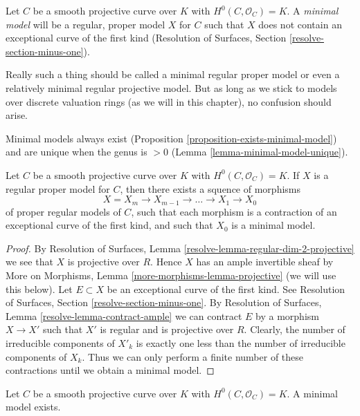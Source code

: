 \begin{definition}
\label{definition-minimal-model}
Let $C$ be a smooth projective curve over $K$ with
$H^0(C, \mathcal{O}_C) = K$. A {\it minimal model}
will be a regular, proper model $X$ for $C$ such that
$X$ does not contain an exceptional curve of the first kind
(Resolution of Surfaces, Section \ref{resolve-section-minus-one}).
\end{definition}

\noindent
Really such a thing should be called a minimal regular proper model
or even a relatively minimal regular projective model. But as long
as we stick to models over discrete valuation rings (as we will
in this chapter), no confusion should arise.

\medskip\noindent
Minimal models always exist
(Proposition \ref{proposition-exists-minimal-model}) and are unique
when the genus is $> 0$ (Lemma \ref{lemma-minimal-model-unique}).

\begin{lemma}
\label{lemma-pre-exists-minimal-model}
Let $C$ be a smooth projective curve over $K$ with
$H^0(C, \mathcal{O}_C) = K$. If $X$ is a regular proper
model for $C$, then there exists a squence of morphisms
$$
X = X_m \to X_{m - 1} \to \ldots \to X_1 \to X_0
$$
of proper regular models of $C$, such that each morphism is a
contraction of an exceptional curve of the first kind, and such
that $X_0$ is a minimal model.
\end{lemma}

\begin{proof}
By Resolution of Surfaces, Lemma \ref{resolve-lemma-regular-dim-2-projective}
we see that $X$ is projective over $R$. Hence $X$ has an ample
invertible sheaf by
More on Morphisms, Lemma \ref{more-morphisms-lemma-projective}
(we will use this below).
Let $E \subset X$ be an exceptional curve of the first kind.
See Resolution of Surfaces, Section \ref{resolve-section-minus-one}.
By Resolution of Surfaces, Lemma \ref{resolve-lemma-contract-ample}
we can contract $E$ by a morphism $X \to X'$ such that $X'$ is
regular and is projective over $R$. Clearly, the number of
irreducible components of $X'_k$ is exactly one less than the
number of irreducible components of $X_k$. Thus we can only
perform a finite number of these contractions until we
obtain a minimal model.
\end{proof}

\begin{proposition}
\label{proposition-exists-minimal-model}
Let $C$ be a smooth projective curve over $K$ with
$H^0(C, \mathcal{O}_C) = K$. A minimal model exists.
\end{proposition}

